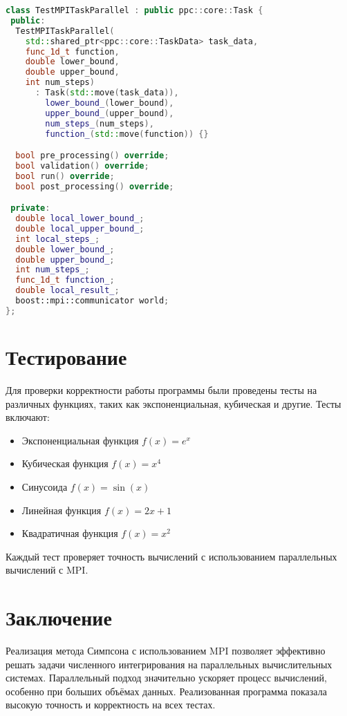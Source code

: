 \documentclass[a4paper,12pt]{article}
\begin{document}
\begin{lstlisting}[language=C++, frame=single, caption={Класс для параллельного выполнения задачи}, breaklines=true]
class TestMPITaskParallel : public ppc::core::Task {
 public:
  TestMPITaskParallel(
    std::shared_ptr<ppc::core::TaskData> task_data, 
    func_1d_t function, 
    double lower_bound, 
    double upper_bound, 
    int num_steps)
      : Task(std::move(task_data)),
        lower_bound_(lower_bound),
        upper_bound_(upper_bound),
        num_steps_(num_steps),
        function_(std::move(function)) {}

  bool pre_processing() override;
  bool validation() override;
  bool run() override;
  bool post_processing() override;

 private:
  double local_lower_bound_;
  double local_upper_bound_;
  int local_steps_;
  double lower_bound_;
  double upper_bound_;
  int num_steps_;
  func_1d_t function_;
  double local_result_;
  boost::mpi::communicator world;
};
\end{lstlisting}

\section{Тестирование}
Для проверки корректности работы программы были проведены тесты на различных функциях, таких как экспоненциальная, кубическая и другие. Тесты включают:

\begin{itemize}
    \item Экспоненциальная функция \( f(x) = e^x \)
    \item Кубическая функция \( f(x) = x^4 \)
    \item Синусоида \( f(x) = \sin(x) \)
    \item Линейная функция \( f(x) = 2x + 1 \)
    \item Квадратичная функция \( f(x) = x^2 \)
\end{itemize}

Каждый тест проверяет точность вычислений с использованием параллельных вычислений с MPI.

\section{Заключение}
Реализация метода Симпсона с использованием MPI позволяет эффективно решать задачи численного интегрирования на параллельных вычислительных системах. Параллельный подход значительно ускоряет процесс вычислений, особенно при больших объёмах данных. Реализованная программа показала высокую точность и корректность на всех тестах.
\end{document}
